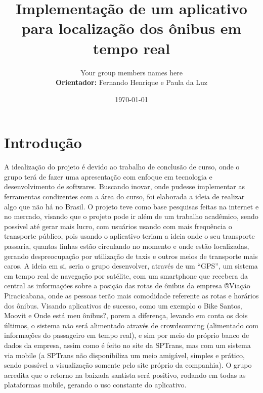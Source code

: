 \documentclass[dvips,12pt]{article}
\begin{document}

\title{Implementação de um aplicativo para localização dos ônibus em tempo real}
\author{Your group members names here\\
\textbf{Orientador:} Fernando Henrique e Paula da Luz
}
\date{\today}



\maketitle


\section{Introdução}

A idealização do projeto é devido ao trabalho de conclusão de curso, onde o grupo terá de fazer uma apresentação com enfoque em tecnologia e desenvolvimento de softwares.
Buscando inovar, onde pudesse implementar as ferramentas condizentes com a área do curso, foi elaborada a ideia de realizar algo que não há no Brasil. O projeto teve como base pesquisas feitas na internet e no mercado, visando que o projeto pode ir além de um trabalho acadêmico, sendo possível até gerar mais lucro, com usuários usando com mais frequência o transporte público, pois usando o aplicativo teriam a ideia onde o seu transporte passaria, quantas linhas estão circulando no momento e onde estão localizadas, gerando despreocupação por utilização de taxis e outros meios de transporte mais caros.
A ideia em si, seria o grupo desenvolver, através de um ``GPS'', um sistema em tempo real de navegação por satélite, com um smartphone que recebera da central as informações sobre a posição das rotas de ônibus da empresa ®Viação Piracicabana, onde as pessoas terão mais comodidade referente as rotas e horários dos ônibus. 
Visando aplicativos de sucesso, como um exemplo o Bike Santos, Moovit e Onde está meu ônibus?, porem a diferença, levando em conta os dois últimos, o sistema não será alimentado através de crowdsourcing (alimentado com informações do passageiro em tempo real), e sim por meio do próprio banco de dados da empresa, assim como é feito no site da SPTrans, mas com um sistema via mobile (a SPTrans não disponibiliza um meio amigável, simples e prático, sendo possível a visualização somente pelo site próprio da companhia). O grupo acredita que o retorno  na baixada santista será positivo, rodando em todas as plataformas mobile, gerando o uso constante do aplicativo. 
\end{document}
